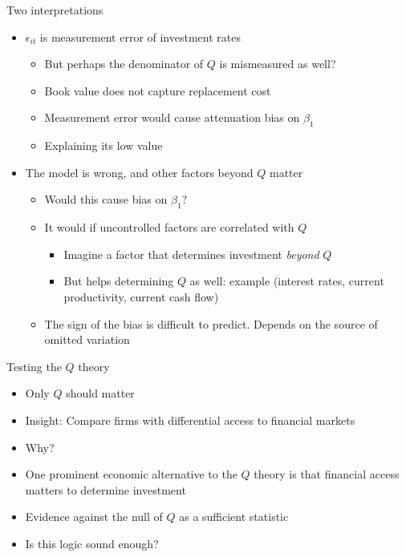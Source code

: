 \documentclass[11pt,aspectratio=169,xcolor={dvipsnames},hyperref={pdftex,pdfpagemode=UseNone,hidelinks,pdfdisplaydoctitle=true},usepdftitle=false]{beamer}
\begin{document}
\begin{frame}{Two interpretations}
\begin{itemize}
\pause
\item $\epsilon_{it}$ is measurement error of investment rates
\pause
\begin{itemize}
\item But perhaps the denominator of $Q$ is mismeasured as well?
\pause
\item Book value does not capture replacement cost
\pause
\item Measurement error would cause attenuation bias on $\beta_1$
\pause
\item Explaining its low value
\end{itemize}
\item The model is wrong, and other factors beyond $Q$ matter
\pause
\begin{itemize}
\item Would this cause bias on $\beta_1$?
\pause
\item It would if uncontrolled factors are correlated with $Q$
\pause
\begin{itemize}
\item Imagine a factor that determines investment \textit{beyond} $Q$
\pause
\item But helps determining $Q$ as well: example (interest rates, current productivity, current cash flow)
\end{itemize}
\pause
\item The sign of the bias is difficult to predict. Depends on the source of omitted variation
\end{itemize}
\end{itemize}
\end{frame}

\begin{frame}{Testing the $Q$ theory}
\begin{itemize}
\item Only $Q$ should matter
\pause
\item Insight: Compare firms with differential access to financial markets
\pause
\item Why?
\pause
\item One prominent economic alternative to the $Q$ theory is that financial access matters to determine investment
\pause
\item Evidence against the null of $Q$ as a sufficient statistic
\pause
\item Is this logic sound enough?
\end{itemize}
\end{frame}
\end{document}
